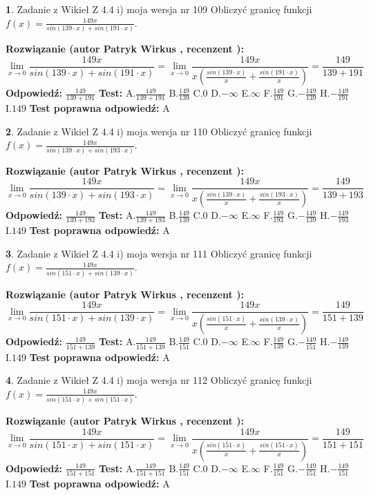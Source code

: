 \documentclass[12pt, a4paper]{article}
\theoremstyle{definition} %
\newtheorem{zad}{}
\newcommand{\zadStart}[1]{\begin{zad}#1\newline}
\newcommand{\zadStop}{\end{zad}}
\newcommand{\rozwStart}[2]{\noindent \textbf{Rozwiązanie (autor #1 , recenzent #2): }\newline}
\newcommand{\rozwStop}{\newline}
\newcommand{\odpStart}{\noindent \textbf{Odpowiedź:}\newline}
\newcommand{\odpStop}{\newline}
\newcommand{\testStart}{\noindent \textbf{Test:}\newline}
\newcommand{\testStop}{\newline}
\newcommand{\kluczStart}{\noindent \textbf{Test poprawna odpowiedź:}\newline}
\newcommand{\kluczStop}{\newline}
\begin{document}
\zadStart{Zadanie z Wikieł Z 4.4 i) moja wersja nr 109}
Obliczyć granicę funkcji $f(x)=\frac{149x}{sin(139\cdot x) +sin(191\cdot x)}$.
\zadStop
\rozwStart{Patryk Wirkus}{}
$$\lim\limits_{x\to 0}\frac{149x}{sin(139\cdot x) +sin(191\cdot x)}=\lim\limits_{x\to 0}\frac{149x}{x(\frac{sin(139\cdot x)}{x}+\frac{sin(191\cdot x)}{x})}=\frac{149}{139+191}$$
\rozwStop
\odpStart
$\frac{149}{139+191}$
\odpStop
\testStart
A.$\frac{149}{139+191}$
B.$\frac{149}{139}$
C.$0$
D.$-\infty$
E.$\infty$
F.$\frac{149}{191}$
G.$-\frac{149}{139}$
H.$-\frac{149}{191}$
I.$149$
\testStop
\kluczStart
A
\kluczStop



\zadStart{Zadanie z Wikieł Z 4.4 i) moja wersja nr 110}
Obliczyć granicę funkcji $f(x)=\frac{149x}{sin(139\cdot x) +sin(193\cdot x)}$.
\zadStop
\rozwStart{Patryk Wirkus}{}
$$\lim\limits_{x\to 0}\frac{149x}{sin(139\cdot x) +sin(193\cdot x)}=\lim\limits_{x\to 0}\frac{149x}{x(\frac{sin(139\cdot x)}{x}+\frac{sin(193\cdot x)}{x})}=\frac{149}{139+193}$$
\rozwStop
\odpStart
$\frac{149}{139+193}$
\odpStop
\testStart
A.$\frac{149}{139+193}$
B.$\frac{149}{139}$
C.$0$
D.$-\infty$
E.$\infty$
F.$\frac{149}{193}$
G.$-\frac{149}{139}$
H.$-\frac{149}{193}$
I.$149$
\testStop
\kluczStart
A
\kluczStop



\zadStart{Zadanie z Wikieł Z 4.4 i) moja wersja nr 111}
Obliczyć granicę funkcji $f(x)=\frac{149x}{sin(151\cdot x) +sin(139\cdot x)}$.
\zadStop
\rozwStart{Patryk Wirkus}{}
$$\lim\limits_{x\to 0}\frac{149x}{sin(151\cdot x) +sin(139\cdot x)}=\lim\limits_{x\to 0}\frac{149x}{x(\frac{sin(151\cdot x)}{x}+\frac{sin(139\cdot x)}{x})}=\frac{149}{151+139}$$
\rozwStop
\odpStart
$\frac{149}{151+139}$
\odpStop
\testStart
A.$\frac{149}{151+139}$
B.$\frac{149}{151}$
C.$0$
D.$-\infty$
E.$\infty$
F.$\frac{149}{139}$
G.$-\frac{149}{151}$
H.$-\frac{149}{139}$
I.$149$
\testStop
\kluczStart
A
\kluczStop



\zadStart{Zadanie z Wikieł Z 4.4 i) moja wersja nr 112}
Obliczyć granicę funkcji $f(x)=\frac{149x}{sin(151\cdot x) +sin(151\cdot x)}$.
\zadStop
\rozwStart{Patryk Wirkus}{}
$$\lim\limits_{x\to 0}\frac{149x}{sin(151\cdot x) +sin(151\cdot x)}=\lim\limits_{x\to 0}\frac{149x}{x(\frac{sin(151\cdot x)}{x}+\frac{sin(151\cdot x)}{x})}=\frac{149}{151+151}$$
\rozwStop
\odpStart
$\frac{149}{151+151}$
\odpStop
\testStart
A.$\frac{149}{151+151}$
B.$\frac{149}{151}$
C.$0$
D.$-\infty$
E.$\infty$
F.$\frac{149}{151}$
G.$-\frac{149}{151}$
H.$-\frac{149}{151}$
I.$149$
\testStop
\kluczStart
A
\kluczStop
\end{document}
